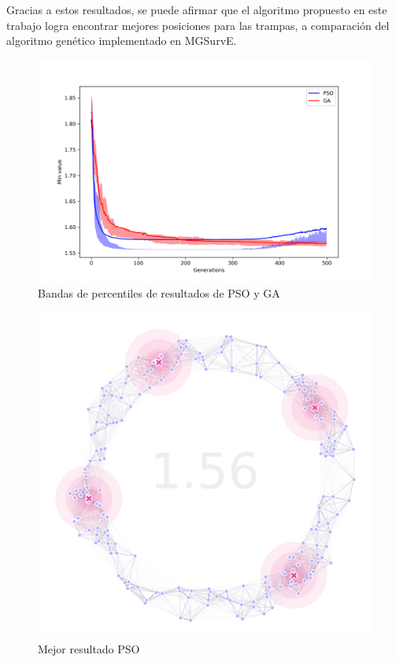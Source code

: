 \documentclass[letterpaper]{report}
\begin{document}
    Gracias a estos resultados, se puede afirmar que el algoritmo propuesto en
    este trabajo logra encontrar mejores posiciones para las trampas, a
    comparación del algoritmo genético implementado en MGSurvE.

    \begin{figure}[ht!]
      \centering
      \includegraphics[width=\textwidth]{percentile.png}
      \caption{Bandas de percentiles de resultados de PSO y GA}
      \label{fig:percentile}
    \end{figure}

    \begin{figure}[ht!]
      \centering
      \includegraphics[width=\textwidth]{pso-best.png}
      \caption{Mejor resultado PSO}
      \label{fig:pso-best}
    \end{figure}
\end{document}
